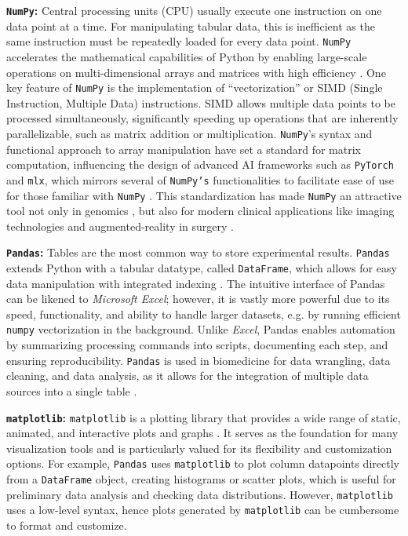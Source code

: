 \textbf{\texttt{NumPy}:} Central processing units (CPU) usually execute one
instruction on one data point at a time. For manipulating tabular data, this is
inefficient as the same instruction must be repeatedly loaded for every data
point. \texttt{NumPy} accelerates the mathematical capabilities of Python by
enabling large-scale operations on multi-dimensional arrays and matrices with
high efficiency \cite{harrisArrayProgrammingNumPy2020}. One key feature of
\texttt{NumPy} is the implementation of ``vectorization'' or SIMD (Single
Instruction, Multiple Data) instructions. SIMD allows multiple data points to be
processed simultaneously, significantly speeding up operations that are
inherently parallelizable, such as matrix addition or multiplication.
\texttt{NumPy}’s syntax and functional approach to array manipulation have set a
standard for matrix computation, influencing the design of advanced AI
frameworks such as \texttt{PyTorch} and \texttt{mlx}, which mirrors several of
\texttt{NumPy’s} functionalities to facilitate ease of use for those familiar
with \texttt{NumPy} \cite{paszkePyTorchImperativeStyle2019,MlexploreMlx2024}.
This standardization has made \texttt{NumPy} an attractive tool not only in
genomics \cite{dingPyComplexHeatmapPythonPackage2023}, but also for modern
clinical applications like imaging technologies and augmented-reality in
surgery \cite{thompsonSciKitSurgeryCompactLibraries2020}.


\textbf{\texttt{Pandas}:} Tables are the most common way to store experimental
results. \texttt{Pandas} extends Python with a tabular datatype, called
\texttt{DataFrame}, which allows for easy data manipulation with integrated
indexing \cite{mckinneyPandasFoundationalPython2011}. The intuitive interface of
Pandas can be likened to \textit{Microsoft Excel}; however, it is vastly more
powerful due to its speed, functionality, and ability to handle larger datasets,
e.g. by running efficient \texttt{numpy} vectorization in the background. Unlike
\textit{Excel}, Pandas enables automation by summarizing processing commands
into scripts, documenting each step, and ensuring reproducibility.
\texttt{Pandas} is used in biomedicine for data wrangling, data cleaning, and
data analysis, as it allows for the integration of multiple data sources into a
single table \cite{santosCOVID19ScholarlyProduction2020}.

\textbf{\texttt{matplotlib}:} \texttt{matplotlib} is a plotting library that
provides a wide range of static, animated, and interactive plots and graphs
\cite{hunterMatplotlib2DGraphics2007}. It serves as the foundation for many
visualization tools and is particularly valued for its flexibility and
customization options. For example, \texttt{Pandas} uses \texttt{matplotlib} to
plot column datapoints directly from a \texttt{DataFrame} object, creating
histograms or scatter plots, which is useful for preliminary data analysis and
checking data distributions. However, \texttt{matplotlib} uses a low-level
syntax, hence plots generated by \texttt{matplotlib} can be cumbersome to format
and customize.


